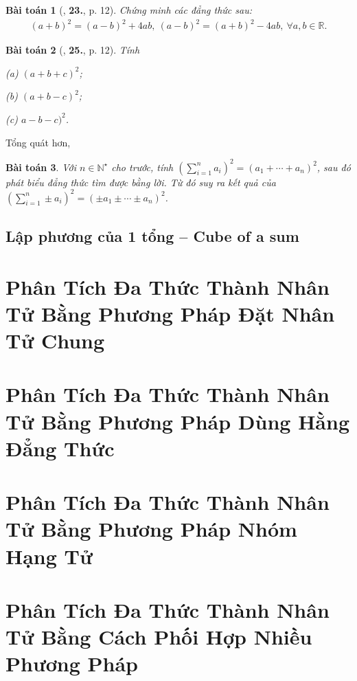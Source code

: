 \documentclass[oneside]{book}
\numberwithin{equation}{section}
\newtheorem{baitoan}{Bài toán}[section]
\begin{document}
\begin{baitoan}[\cite{SGK_Toan_8_tap_1}, \textbf{23.}, p. 12]
	Chứng minh các đẳng thức sau:
	\begin{align*}
		(a + b)^2 = (a - b)^2 + 4ab,\ (a - b)^2 = (a + b)^2 - 4ab,\ \forall a,b\in\mathbb{R}.
	\end{align*}
\end{baitoan}

\begin{baitoan}[\cite{SGK_Toan_8_tap_1}, \textbf{25.}, p. 12]
	Tính
	\begin{enumerate*}
		\item[(a)] $(a + b + c)^2$;
		\item[(b)] $(a + b - c)^2$;
		\item[(c)] $a - b - c)^2$.
	\end{enumerate*}
\end{baitoan}
Tổng quát hơn,
\begin{baitoan}
	Với $n\in\mathbb{N}^\star$ cho trước, tính $\left(\sum_{i=1}^n a_i\right)^2 = (a_1 + \cdots + a_n)^2$, sau đó phát biểu đẳng thức tìm được bằng lời. Từ đó suy ra kết quả của $\left(\sum_{i=1}^n \pm a_i\right)^2 = (\pm a_1\pm\cdots\pm a_n)^2$.
\end{baitoan}

\subsection{Lập phương của 1 tổng -- Cube of a sum}

\section{Phân Tích Đa Thức Thành Nhân Tử Bằng Phương Pháp Đặt Nhân Tử Chung}

\section{Phân Tích Đa Thức Thành Nhân Tử Bằng Phương Pháp Dùng Hằng Đẳng Thức}

\section{Phân Tích Đa Thức Thành Nhân Tử Bằng Phương Pháp Nhóm Hạng Tử}

\section{Phân Tích Đa Thức Thành Nhân Tử Bằng Cách Phối Hợp Nhiều Phương Pháp}
\end{document}

